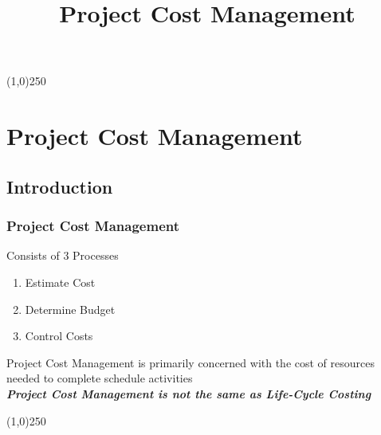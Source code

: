 


%
\title[Project Management \& BIM]{Project Cost Management}



%

\tableofcontents
\newpage



\begin{frame}
\titlepage
\end{frame}
\begin{center}\line(1,0){250}\end{center}
%
%


\section{Project Cost Management}

\subsection{Introduction}


\begin{frame}
\frametitle{Project Cost Management}
Consists of 3 Processes\\
\begin{enumerate}
	\item Estimate Cost
	\item Determine Budget
	\item Control Costs
\end{enumerate}
Project Cost Management is primarily concerned with the cost of resources needed to complete schedule activities\\
\textbf\textit{Project Cost Management is not the same as Life-Cycle Costing}\\
\end{frame}
\begin{center}\line(1,0){250}\end{center}



